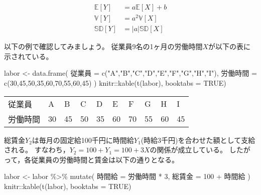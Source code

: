 \documentclass[
  letterpaper,
  pandoc,
  ja=standard,
  jafont = hiragino-pron]{ltjsbook}
\newenvironment{Shaded}{\begin{snugshade}}{\end{snugshade}}
\newcommand{\AttributeTok}[1]{\textcolor[rgb]{0.40,0.45,0.13}{#1}}
\newcommand{\ConstantTok}[1]{\textcolor[rgb]{0.56,0.35,0.01}{#1}}
\newcommand{\DecValTok}[1]{\textcolor[rgb]{0.68,0.00,0.00}{#1}}
\newcommand{\FunctionTok}[1]{\textcolor[rgb]{0.28,0.35,0.67}{#1}}
\newcommand{\NormalTok}[1]{\textcolor[rgb]{0.00,0.23,0.31}{#1}}
\newcommand{\OtherTok}[1]{\textcolor[rgb]{0.00,0.23,0.31}{#1}}
\newcommand{\SpecialCharTok}[1]{\textcolor[rgb]{0.37,0.37,0.37}{#1}}
\newcommand{\StringTok}[1]{\textcolor[rgb]{0.13,0.47,0.30}{#1}}
\begin{document}
\[
\begin{aligned}
\mathbb{E}[Y] &= a\mathbb{E}[X] + b \\
\mathbb{V}[Y] &= a^2 \mathbb{V}[X] \\
\mathbb{SD}[Y] &= |a| \mathbb{SD}[X]
\end{aligned}
\]

以下の例で確認してみましょう。
従業員9名の1ヶ月の労働時間\(X\)が以下の表に示されている。

\begin{Shaded}
\begin{Highlighting}[]
\NormalTok{labor }\OtherTok{\textless{}{-}} \FunctionTok{data.frame}\NormalTok{(}
\NormalTok{    従業員 }\OtherTok{=} \FunctionTok{c}\NormalTok{(}\StringTok{"A"}\NormalTok{,}\StringTok{"B"}\NormalTok{,}\StringTok{"C"}\NormalTok{,}\StringTok{"D"}\NormalTok{,}\StringTok{"E"}\NormalTok{,}\StringTok{"F"}\NormalTok{,}\StringTok{"G"}\NormalTok{,}\StringTok{"H"}\NormalTok{,}\StringTok{"I"}\NormalTok{),}
\NormalTok{    労働時間 }\OtherTok{=} \FunctionTok{c}\NormalTok{(}\DecValTok{30}\NormalTok{,}\DecValTok{45}\NormalTok{,}\DecValTok{50}\NormalTok{,}\DecValTok{35}\NormalTok{,}\DecValTok{60}\NormalTok{,}\DecValTok{70}\NormalTok{,}\DecValTok{55}\NormalTok{,}\DecValTok{60}\NormalTok{,}\DecValTok{45}\NormalTok{)}
\NormalTok{)}
\NormalTok{knitr}\SpecialCharTok{::}\FunctionTok{kable}\NormalTok{(}\FunctionTok{t}\NormalTok{(labor), }\AttributeTok{booktabs =} \ConstantTok{TRUE}\NormalTok{)}
\end{Highlighting}
\end{Shaded}

\begin{longtable}[]{@{}llllllllll@{}}
\toprule\noalign{}
\endhead
\bottomrule\noalign{}
\endlastfoot
従業員 & A & B & C & D & E & F & G & H & I \\
労働時間 & 30 & 45 & 50 & 35 & 60 & 70 & 55 & 60 & 45 \\
\end{longtable}

総賃金\(Y_2\)は毎月の固定給100千円に時間給\(Y_1\)(時給3千円)を合わせた額として支給される。
すなわち，\(Y_2 = 100 + Y_1 = 100 + 3X\)の関係が成立している。
したがって，各従業員の労働時間と賃金は以下の通りとなる。

\begin{Shaded}
\begin{Highlighting}[]
\NormalTok{labor }\OtherTok{\textless{}{-}}\NormalTok{ labor }\SpecialCharTok{\%\textgreater{}\%}
    \FunctionTok{mutate}\NormalTok{(}
\NormalTok{        時間給 }\OtherTok{=}\NormalTok{ 労働時間 }\SpecialCharTok{*} \DecValTok{3}\NormalTok{,}
\NormalTok{        総賃金 }\OtherTok{=} \DecValTok{100} \SpecialCharTok{+}\NormalTok{ 時間給}
\NormalTok{    )}
\NormalTok{knitr}\SpecialCharTok{::}\FunctionTok{kable}\NormalTok{(}\FunctionTok{t}\NormalTok{(labor), }\AttributeTok{booktabs =} \ConstantTok{TRUE}\NormalTok{)}
\end{Highlighting}
\end{Shaded}
\end{document}

